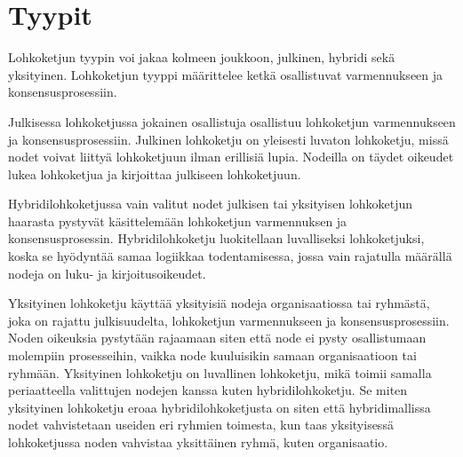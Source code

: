\documentclass[utf8,bachelor]{gradu3}
\begin{document}
\section{Tyypit}

Lohkoketjun tyypin voi jakaa kolmeen joukkoon, julkinen, hybridi sekä yksityinen. Lohkoketjun tyyppi määrittelee ketkä osallistuvat varmennukseen ja konsensusprosessiin.

Julkisessa lohkoketjussa jokainen osallistuja osallistuu lohkoketjun varmennukseen ja konsensusprosessiin. Julkinen lohkoketju on yleisesti luvaton lohkoketju, missä nodet voivat liittyä lohkoketjuun ilman erillisiä lupia. Nodeilla on täydet oikeudet lukea lohkoketjua ja kirjoittaa julkiseen lohkoketjuun.

Hybridilohkoketjussa vain valitut nodet julkisen tai yksityisen lohkoketjun haarasta pystyvät käsittelemään lohkoketjun varmennuksen ja konsensusprosessin. Hybridilohkoketju luokitellaan luvalliseksi lohkoketjuksi, koska se hyödyntää samaa logiikkaa todentamisessa, jossa vain rajatulla määrällä nodeja on luku- ja kirjoitusoikeudet.

Yksityinen lohkoketju käyttää yksityisiä nodeja organisaatiossa tai ryhmästä, joka on rajattu julkisuudelta, lohkoketjun varmennukseen ja konsensusprosessiin. Noden oikeuksia pystytään rajaamaan siten että node ei pysty osallistumaan molempiin prosesseihin, vaikka node kuuluisikin samaan organisaatioon tai ryhmään.  Yksityinen lohkoketju on luvallinen lohkoketju, mikä toimii samalla periaatteella valittujen nodejen kanssa kuten hybridilohkoketju. Se miten yksityinen lohkoketju eroaa hybridilohkoketjusta on siten että hybridimallissa nodet vahvistetaan useiden eri ryhmien toimesta, kun taas yksityisessä lohkoketjussa noden vahvistaa yksittäinen ryhmä, kuten organisaatio.
\end{document}
